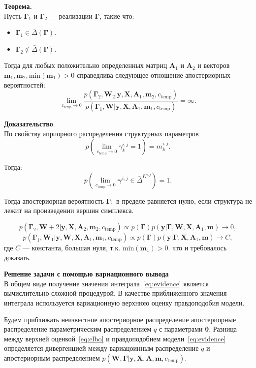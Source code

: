 \textbf{Теорема.} \\
Пусть $\boldsymbol{\Gamma}_1$ и $\boldsymbol{\Gamma}_2$ --- реализации $\boldsymbol{\Gamma}$, такие что:
\begin{itemize}
\item $\boldsymbol{\Gamma}_1 \in \bar{\Delta}(\boldsymbol{\Gamma})$.
\item $\boldsymbol{\Gamma}_2 \not \in \bar{\Delta}(\boldsymbol{\Gamma})$.
\end{itemize} 
Тогда для любых положительно определенных матриц $\mathbf{A}_1$ и $\mathbf{A}_2$ и векторов $\mathbf{m}_1, \mathbf{m}_2, \text{min}(\mathbf{m}_1)>0$ справедлива следующее отношение апостериорных вероятностей:
$$\lim_{c_\text{temp} \to 0} \frac{p(\boldsymbol{\Gamma}_2, \mathbf{W}_2|\mathbf{y},  \mathbf{X},\mathbf{A}_1,\mathbf{m}_2, {c_\text{temp}})}{p(\boldsymbol{\Gamma}_1,  \mathbf{W}|\mathbf{y}, \mathbf{X},\mathbf{A}_1,\mathbf{m}_1, {c_\text{temp}})} = \infty.$$

\textbf{Доказательство}.\\
По свойству априорного распределения структурных параметров
$$p(\lim_{c_{\text{temp}} \to 0} {\gamma}^{i,j}_k  = 1) = {m}^{i,j}_k.$$

Тогда:
$$p(\lim_{c_{\text{temp}} \to 0} \boldsymbol{\gamma}^{i,j} \in \bar{\Delta}^{K^{i,j}}) = 1.$$

Тогда апостериорная вероятность $\boldsymbol{\Gamma}:$ в пределе равняется нулю, если структура не лежит на произведении вершин симплекса.

$$p(\boldsymbol{\Gamma}_2, \mathbf{W}+2|\mathbf{y}, \mathbf{X},\mathbf{A}_2,\mathbf{m}_2, {c_\text{temp}}) \propto p(\boldsymbol{\Gamma}) p(\mathbf{y} |\boldsymbol{\Gamma},   \mathbf{W}, \mathbf{X},\mathbf{A}_1,\mathbf{m}) \to 0,$$
$$p(\boldsymbol{\Gamma}_1,  \mathbf{W}_1|\mathbf{y}, \mathbf{W}, \mathbf{X},\mathbf{A}_1,\mathbf{m}_1, {c_\text{temp}}) \propto p(\boldsymbol{\Gamma}) p(\mathbf{y} |\boldsymbol{\Gamma},  \mathbf{X},\mathbf{A}_1,\mathbf{m}) \to C,$$
где $C$ --- константа, большая нуля, т.к. $ \text{min}(\mathbf{m}_1)>0$.
что и требовалось доказать.

\textbf{Решение задачи с помощью вариационного вывода}\\
В общем виде получение значения интеграла~\eqref{eq:evidence} является вычислительно сложной процедурой. В качестве приближенного значения интеграла используется вариационную верхнюю оценку правдоподобия модели. 

Будем приближать неизвестное апостериорное распределение апостериорные распределение параметрическим распределением $q$ с параметрами $\boldsymbol{\theta}$.
Разница между верхней оценкой~\eqref{eq:elbo} и правдоподобием модели~\eqref{eq:evidence} определяется дивергенцией между вариацоинным распределение $q$ и апостериорным распределением $p(\mathbf{W}, \boldsymbol{\Gamma}|\mathbf{y}, \mathbf{X}, \mathbf{A},\mathbf{m}, c_{\text{temp}})$. 

